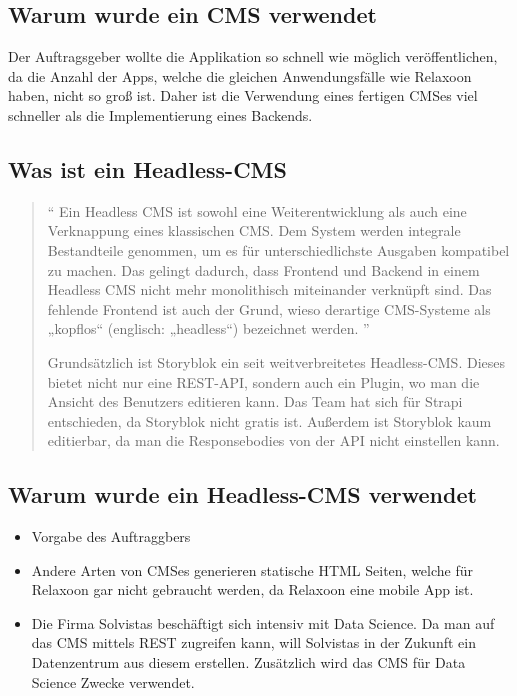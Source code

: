 \begin{spacing}{1}
    \subsection{Warum wurde ein CMS verwendet}
    Der Auftragsgeber wollte die Applikation so schnell wie möglich veröffentlichen,
    da die Anzahl der Apps, welche die gleichen Anwendungsfälle wie Relaxoon haben,
    nicht so groß ist.
    Daher ist die Verwendung eines fertigen CMSes viel schneller als
    die Implementierung eines Backends.

    \subsection{Was ist ein Headless-CMS}
    \begin{quotation}

        ``
        Ein Headless CMS ist sowohl eine Weiterentwicklung als
        auch eine Verknappung eines klassischen CMS. Dem System
        werden integrale Bestandteile genommen, um es für
        unterschiedlichste Ausgaben kompatibel zu machen.
        Das gelingt dadurch, dass Frontend und Backend in einem
        Headless CMS nicht mehr monolithisch miteinander verknüpft
        sind. Das fehlende Frontend ist auch der Grund,
        wieso derartige CMS-Systeme als
        „kopflos“ (englisch: „headless“) bezeichnet werden.
        '' \cite{headles-cms}

        Grundsätzlich ist Storyblok ein seit weitverbreitetes Headless-CMS. Dieses bietet nicht nur eine REST-API, sondern auch ein Plugin, wo man die Ansicht des Benutzers editieren kann.
        Das Team hat sich für Strapi entschieden, da Storyblok nicht gratis ist. Außerdem ist Storyblok kaum editierbar, da man die Responsebodies von der API nicht einstellen kann. \cite[]{storyblok-bad}
    \end{quotation}

    \subsection{Warum wurde ein Headless-CMS verwendet}
    \begin{itemize}
        \item Vorgabe des Auftraggbers
        \item Andere Arten von CMSes generieren statische HTML Seiten, welche für Relaxoon gar nicht gebraucht werden,
              da Relaxoon eine mobile App ist.
        \item Die Firma Solvistas beschäftigt sich intensiv mit Data Science. Da man auf das CMS mittels REST zugreifen kann,
              will Solvistas in der Zukunft ein Datenzentrum aus diesem erstellen.
              Zusätzlich wird das CMS für Data Science Zwecke verwendet.
    \end{itemize}


\end{spacing}
